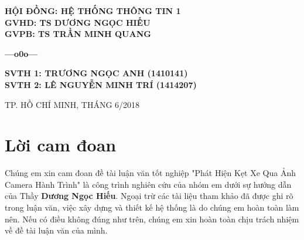 \documentclass[12pt]{report}
\begin{document}
\begin{titlepage}
\vspace{15mm}

\begin{addmargin}[100pt]{0pt}
\textbf{{\fontsize{15}{15}\selectfont HỘI ĐỒNG: HỆ THỐNG THÔNG TIN 1}}\\
\textbf{{\fontsize{15}{15}\selectfont GVHD: TS DƯƠNG NGỌC HIẾU}}\\
\textbf{{\fontsize{15}{15}\selectfont GVPB: TS TRẦN MINH QUANG}}
\begin{center}
\textbf{{\fontsize{15}{15}\selectfont ---o0o---}}
\end{center}
\textbf{{\fontsize{15}{15}\selectfont SVTH 1: TRƯƠNG NGỌC ANH (1410141)}}\\
\textbf{{\fontsize{15}{15}\selectfont SVTH 2: LÊ NGUYỄN MINH TRÍ (1414207)}}\\

\end{addmargin}
\null\vfill
\begin{center}
        TP. HỒ CHÍ MINH, THÁNG 6/2018
\end{center}

\thispagestyle{empty}
\end{titlepage}
%
\tableofcontents

%

%
\listoffigures
\listoftables
\chapter*{Lời cam đoan}
Chúng em xin cam đoan đề tài luận văn tốt nghiệp "Phát Hiện Kẹt Xe Qua Ảnh Camera Hành Trình" là công trình nghiên cứu của nhóm em dưới sự hướng dẫn của Thầy \textbf{Dương Ngọc Hiếu}. Ngoại trừ các tài liệu tham khảo đã được ghi rõ trong luận văn, việc xây dựng và thiết kế hệ thống là do chúng em hoàn toàn làm nên. Nếu có điều không đúng như trên, chúng em xin hoàn toàn chịu trách nhiệm về đề tài luận văn của mình.
\end{document}
